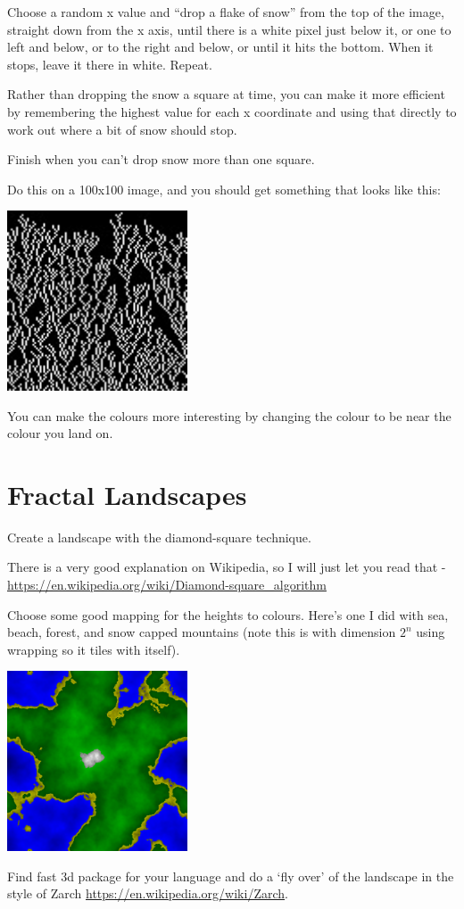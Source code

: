 \documentclass{article}
\begin{document}
        Choose a random x value and ``drop a flake of snow'' from the top of the image, straight down from the x axis, until there is a
        white pixel just below it, or one to left and below, or to the right and below, or until it hits the bottom. When it stops, leave
        it there in white. Repeat.
        
        Rather than dropping the snow a square at time, you can make it more efficient by remembering the highest value for each x
        coordinate and using that directly to work out where a bit of snow should stop.
        
        Finish when you can't drop snow more than one square.
        
        Do this on a 100x100 image, and you should get something that looks like this:
        
        \begin{center}
            \includegraphics[width=0.4\textwidth]{snow}
        \end{center}
        

        You can make the colours more interesting by changing the colour to be near the colour you land on.        

    \section{Fractal Landscapes}
        Create a landscape with the diamond-square technique.  
        
        There is a very good explanation on Wikipedia, so I will just let you read that - 
        \url{https://en.wikipedia.org/wiki/Diamond-square_algorithm}
        
        Choose some good mapping for the heights to colours.  Here's one I did with sea, beach, forest, and snow capped mountains (note 
        this is with dimension $2^n$ using wrapping so it tiles with itself).
        
        \begin{center}
            \includegraphics[width=0.4\textwidth]{land}
        \end{center}
        
        Find fast 3d package for your language and do a `fly over' of the landscape in the style of Zarch 
        \url{https://en.wikipedia.org/wiki/Zarch}.
\end{document}
